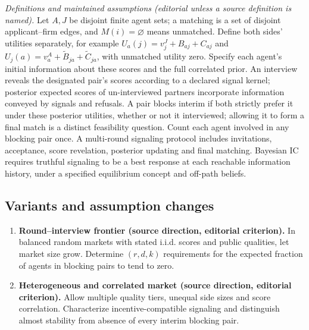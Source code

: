 \documentclass[11pt,a4paper]{article}
\begin{document}
\emph{Definitions and maintained assumptions (editorial unless a source definition is named).} Let \(A,J\) be disjoint finite agent sets; a matching is a set of disjoint applicant--firm edges, and \(M(i)=\varnothing\) means unmatched. Define both sides’ utilities separately, for example \(U_a(j)=v^J_j+B_{aj}+C_{aj}\) and \(U_j(a)=v^A_a+\widetilde B_{ja}+\widetilde C_{ja}\), with unmatched utility zero. Specify each agent’s initial information about these scores and the full correlated prior. An interview reveals the designated pair’s scores according to a declared signal kernel; posterior expected scores of un-interviewed partners incorporate information conveyed by signals and refusals. A pair blocks interim if both strictly prefer it under these posterior utilities, whether or not it interviewed; allowing it to form a final match is a distinct feasibility question. Count each agent involved in any blocking pair once. A multi-round signaling protocol includes invitations, acceptance, score revelation, posterior updating and final matching. Bayesian IC requires truthful signaling to be a best response at each reachable information history, under a specified equilibrium concept and off-path beliefs.
\subsection*{Variants and assumption changes}
\begin{enumerate}
\item \textbf{Round--interview frontier (source direction, editorial criterion).} In balanced random markets with stated i.i.d. scores and public qualities, let market size grow. Determine \((r,d,k)\) requirements for the expected fraction of agents in blocking pairs to tend to zero.
\item \textbf{Heterogeneous and correlated market (source direction, editorial criterion).} Allow multiple quality tiers, unequal side sizes and score correlation. Characterize incentive-compatible signaling and distinguish almost stability from absence of every interim blocking pair.
\end{enumerate}
\end{document}
